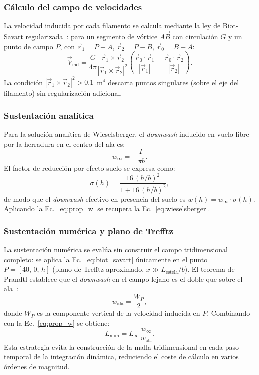\documentclass[twocolumn]{article}
\begin{document}
\subsubsection{Cálculo del campo de velocidades}

La velocidad inducida por cada filamento se calcula mediante la ley de
Biot-Savart regularizada~\cite{katz2001}: para un segmento de vórtice
$\overrightarrow{AB}$ con circulación $G$ y un punto de campo $P$,
con $\vec{r}_1 = P - A$, $\vec{r}_2 = P - B$, $\vec{r}_0 = B - A$:
\begin{equation}
  \vec{V}_\text{ind} = \frac{G}{4\pi}
  \frac{\vec{r}_1 \times \vec{r}_2}{|\vec{r}_1 \times \vec{r}_2|^2}
  \left(
    \frac{\vec{r}_0 \cdot \vec{r}_1}{|\vec{r}_1|} -
    \frac{\vec{r}_0 \cdot \vec{r}_2}{|\vec{r}_2|}
  \right).
  \label{eq:biot_savart}
\end{equation}
La condición $|\vec{r}_1 \times \vec{r}_2|^2 > 0.1$~m$^4$ descarta
puntos singulares (sobre el eje del filamento) sin regularización
adicional.

\subsubsection{Sustentación analítica}

Para la solución analítica de Wieselsberger, el \textit{downwash} inducido
en vuelo libre por la herradura en el centro del ala es:
\begin{equation}
  w_\infty = -\frac{\Gamma}{\pi b}.
  \label{eq:winf}
\end{equation}
El factor de reducción por efecto suelo se expresa como:
\begin{equation}
  \sigma(h) = \frac{16\,(h/b)^2}{1 + 16\,(h/b)^2},
  \label{eq:sigma}
\end{equation}
de modo que el \textit{downwash} efectivo en presencia del suelo es
$w(h) = w_\infty \cdot \sigma(h)$. Aplicando la Ec.~\eqref{eq:prop_w}
se recupera la Ec.~\eqref{eq:wieselsberger}.

\subsubsection{Sustentación numérica y plano de Trefftz}

La sustentación numérica se evalúa sin construir el campo tridimensional
completo: se aplica la Ec.~\eqref{eq:biot_savart} únicamente en el punto
$P = [40,\, 0,\, h]$ (plano de Trefftz aproximado, $x \gg L_\text{estela}/b$).
El teorema de Prandtl establece que el \textit{downwash} en el campo lejano
es el doble que sobre el ala~\cite{prandtl1921}:
\begin{equation}
  w_\text{ala} = \frac{W_P}{2},
  \label{eq:trefftz}
\end{equation}
donde $W_P$ es la componente vertical de la velocidad inducida en $P$.
Combinando con la Ec.~\eqref{eq:prop_w} se obtiene:
\begin{equation}
  L_\text{num} = L_\infty \, \frac{w_\infty}{w_\text{ala}}.
  \label{eq:L_num}
\end{equation}
Esta estrategia evita la construcción de la malla tridimensional en cada
paso temporal de la integración dinámica, reduciendo el coste de cálculo
en varios órdenes de magnitud.
\end{document}

